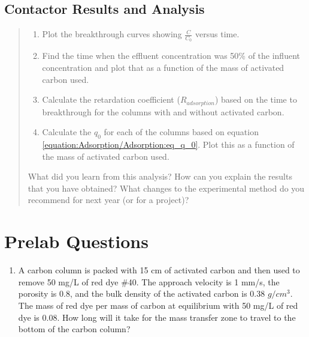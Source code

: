 \documentclass[letterpaper,10pt,english]{sphinxmanual}
\begin{document}
\subsection{Contactor Results and Analysis}
\label{\detokenize{Adsorption/Adsorption:contactor-results-and-analysis}}\begin{quote}
\begin{enumerate}
\item {} 
Plot the breakthrough curves showing \(\frac{C}{C_0}\) versus time.

\item {} 
Find the time when the effluent concentration was 50\% of the influent concentration and plot that as a function of the mass of activated carbon used.

\item {} 
Calculate the retardation coefficient (\(R_{adsorption}\)) based on the time to breakthrough for the columns with and without activated carbon.

\item {} 
Calculate the \(q_0\) for each of the columns based on equation \eqref{equation:Adsorption/Adsorption:eq_q_0}. Plot this as a function of the mass of activated carbon used.

\end{enumerate}

What did you learn from this analysis? How can you explain the results that you have obtained? What changes to the experimental method do you recommend for next year (or for a project)?
\end{quote}


\section{Prelab Questions}
\label{\detokenize{Adsorption/Adsorption:prelab-questions}}\label{\detokenize{Adsorption/Adsorption:heading-adsorption-pre-laboratory-questions}}\begin{enumerate}
\item {} 
A carbon column is packed with 15 cm of activated carbon and then used to remove 50 mg/L of red dye \#40. The approach velocity is 1 mm/s, the porosity is 0.8, and the bulk density of the activated carbon is 0.38 \(g/cm^3\). The mass of red dye per mass of carbon at equilibrium with 50 mg/L of red dye is 0.08. How long will it take for the mass transfer zone to travel to the bottom of the carbon column?

\end{enumerate}
\end{document}
